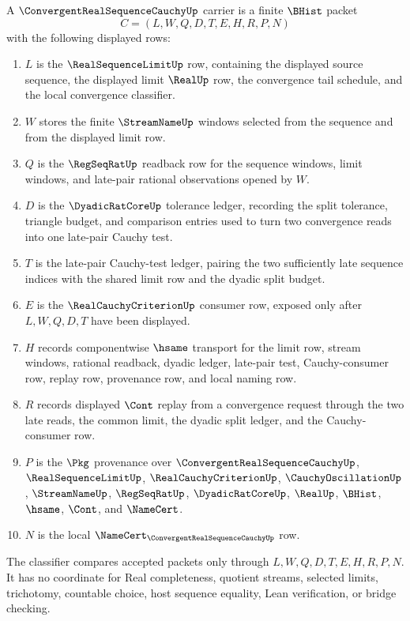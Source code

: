 \begin{definition}\label{def:convergent-real-sequence-cauchy-carrier}
A $\ConvergentRealSequenceCauchyUp$ carrier is a finite $\BHist$ packet
$$
C=(L,W,Q,D,T,E,H,R,P,N)
$$
with the following displayed rows:
\begin{enumerate}
\item $L$ is the $\RealSequenceLimitUp$ row, containing the displayed source sequence, the displayed limit $\RealUp$ row, the convergence tail schedule, and the local convergence classifier.
\item $W$ stores the finite $\StreamNameUp$ windows selected from the sequence and from the displayed limit row.
\item $Q$ is the $\RegSeqRatUp$ readback row for the sequence windows, limit windows, and late-pair rational observations opened by $W$.
\item $D$ is the $\DyadicRatCoreUp$ tolerance ledger, recording the split tolerance, triangle budget, and comparison entries used to turn two convergence reads into one late-pair Cauchy test.
\item $T$ is the late-pair Cauchy-test ledger, pairing the two sufficiently late sequence indices with the shared limit row and the dyadic split budget.
\item $E$ is the $\RealCauchyCriterionUp$ consumer row, exposed only after $L,W,Q,D,T$ have been displayed.
\item $H$ records componentwise $\hsame$ transport for the limit row, stream windows, rational readback, dyadic ledger, late-pair test, Cauchy-consumer row, replay row, provenance row, and local naming row.
\item $R$ records displayed $\Cont$ replay from a convergence request through the two late reads, the common limit, the dyadic split ledger, and the Cauchy-consumer row.
\item $P$ is the $\Pkg$ provenance over $\ConvergentRealSequenceCauchyUp$, $\RealSequenceLimitUp$, $\RealCauchyCriterionUp$, $\CauchyOscillationUp$, $\StreamNameUp$, $\RegSeqRatUp$, $\DyadicRatCoreUp$, $\RealUp$, $\BHist$, $\hsame$, $\Cont$, and $\NameCert$.
\item $N$ is the local $\NameCert_{\ConvergentRealSequenceCauchyUp}$ row.
\end{enumerate}
The classifier compares accepted packets only through $L,W,Q,D,T,E,H,R,P,N$. It has no coordinate for Real completeness, quotient streams, selected limits, trichotomy, countable choice, host sequence equality, Lean verification, or bridge checking.
\end{definition}

